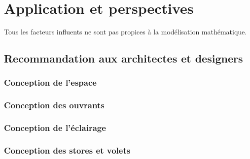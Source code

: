 \part{Application et perspectives}

Tous les facteurs influents ne sont pas propices à la modélisation mathématique. 



\chapter{Recommandation aux architectes et designers}

\section{Conception de l'espace}

\section{Conception des ouvrants}

\section{Conception de l'éclairage}

\section{Conception des stores et volets}